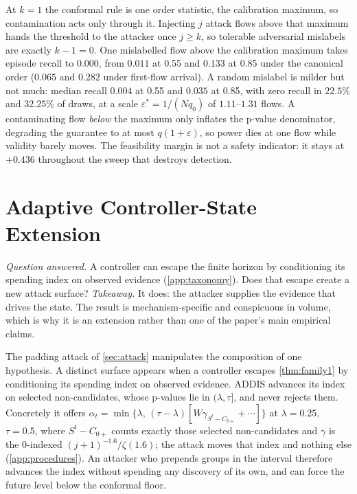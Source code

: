 \documentclass[conference]{IEEEtran}
\newcommand{\alphat}{\alpha_t}
\begin{document}
At $k=1$ the conformal rule is one order statistic, the calibration maximum, so contamination acts only
through it. Injecting $j$ attack flows above that maximum hands the threshold to the attacker once
$j\ge k$, so tolerable adversarial mislabels are exactly $k-1=0$. One mislabelled flow above the
calibration maximum takes episode recall to $0.000$, from $0.011$ at 0.55 and $0.133$ at 0.85 under the
canonical order ($0.065$ and $0.282$ under first-flow arrival). A random mislabel is milder but not much:
median recall $0.004$ at 0.55 and $0.035$ at 0.85, with zero recall in $22.5\%$ and $32.25\%$ of draws,
at a scale $\varepsilon^{*}=1/(Nq_0)$ of $1.11$--$1.31$ flows. A contaminating flow \emph{below} the
maximum only inflates the p-value denominator, degrading the guarantee to at most $q(1+\varepsilon)$, so
power dies at one flow while validity barely moves. The feasibility margin is not a safety indicator: it
stays at $+0.436$ throughout the sweep that destroys detection.







\section{Adaptive Controller-State Extension}\label{app:state}

\emph{Question answered.} A controller can escape the finite horizon by conditioning its spending
index on observed evidence (\cref{app:taxonomy}). Does that escape create a new attack surface?
\emph{Takeaway.} It does: the attacker supplies the evidence that drives the state. The result is
mechanism-specific and conspicuous in volume, which is why it is an extension rather than one of the
paper's main empirical claims.

The padding attack of \cref{sec:attack} manipulates the composition of one hypothesis. A distinct surface appears when a
controller escapes \cref{thm:family1} by conditioning its spending index on observed evidence. ADDIS
advances its index on selected non-candidates, whose p-values lie in $(\lambda,\tau]$, and never rejects
them. Concretely it offers $\alphat=\min\{\lambda,\,(\tau-\lambda)[W\gamma_{S^t-C_{0+}}+\cdots]\}$ at
$\lambda=0.25$, $\tau=0.5$, where $S^t-C_{0+}$ counts exactly those selected non-candidates and $\gamma$
is the $0$-indexed $(j+1)^{-1.6}/\zeta(1.6)$; the attack moves that index and nothing else
(\cref{app:procedures}). An attacker who prepends groups in the interval therefore advances the index
without spending any discovery of its own, and can force the future level below the conformal floor.
\end{document}
